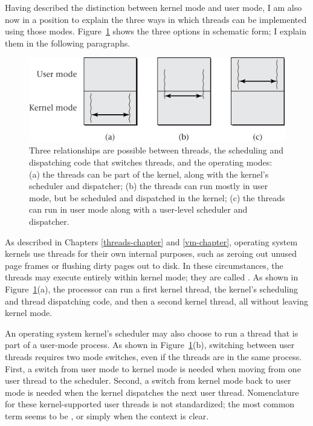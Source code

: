 Having described the distinction between kernel mode and user mode, I
am also now in a position to explain the three ways in which threads
can be implemented using those modes.  Figure~\ref{scan-7-1} shows the
three options in schematic form; I explain them in the following
paragraphs.
\begin{figure}
\centerline{\includegraphics{hail_f0708}}
\caption{Three relationships are possible between threads, the
  scheduling and dispatching code that switches threads, and the operating modes: (a)
  the threads can be part of the kernel, along with the kernel's
  scheduler and dispatcher; (b) the threads can run mostly in user mode, but
  be scheduled and dispatched in the kernel; (c) the threads can run in
  user mode
  along with a user-level scheduler and dispatcher.}
\label{scan-7-1}
\end{figure}

As described in Chapters \ref{threads-chapter} and \ref{vm-chapter},
operating system kernels use threads for their own internal purposes,
such as zeroing out unused page frames or flushing dirty pages out to
disk. In these circumstances, the threads may execute entirely within
kernel mode; they are called .  As shown in
Figure~\ref{scan-7-1}(a), the processor can run a first kernel thread, the
kernel's scheduling and thread dispatching code, and then a second
kernel thread, all without leaving kernel mode.

An operating system kernel's scheduler may also choose to run a thread
that is part of a user-mode process.  As shown in
Figure~\ref{scan-7-1}(b), switching between user threads requires two
mode switches, even if the threads are in the same process.  First, a
switch from user mode to kernel mode is needed when moving from one
user thread to the scheduler.  Second, a switch from kernel mode back to
user mode is needed when the kernel dispatches the next user thread.
Nomenclature for these kernel-supported user threads is not
standardized; the most common term seems to be
, or simply  when the
context is clear.

